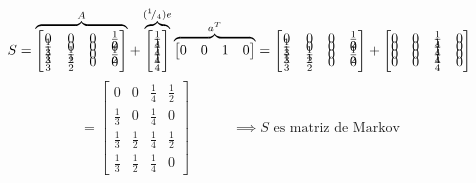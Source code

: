 \begin{align*}
    S =
        \overbrace{
            \begin{bmatrix}
                    0& 0& 0& \frac{1}{2}\\[-0.65em]
                    \frac{1}{3}& 0& 0& 0\\[-0.65em]
                    \frac{1}{3}& \frac{1}{2}& 0& \frac{1}{2}\\[-0.65em]
                    \frac{1}{3}& \frac{1}{2}& 0& 0
            \end{bmatrix}
        }^A
    +
        \overbrace{
            \begin{bmatrix}
                \frac{1}{4}\\[-0.65em]
                \frac{1}{4}\\[-0.65em]
                \frac{1}{4}\\[-0.65em]
                \frac{1}{4}
            \end{bmatrix}
        }^{({}^{1}\!/_{4})e}
        \overbrace{
            \begin{bmatrix}
                0 & 0 & 1 & 0
            \end{bmatrix}
        }^{a^T}
    =
        \begin{bmatrix}
                0& 0& 0& \frac{1}{2}\\[-0.65em]
                \frac{1}{3}& 0& 0& 0\\[-0.65em]
                \frac{1}{3}& \frac{1}{2}& 0& \frac{1}{2}\\[-0.65em]
                \frac{1}{3}& \frac{1}{2}& 0& 0
        \end{bmatrix}
        +
        \begin{bmatrix}
            0&0&\frac{1}{4}&0\\[-0.65em]
            0&0&\frac{1}{4}&0\\[-0.65em]
            0&0&\frac{1}{4}&0\\[-0.65em]
            0&0&\frac{1}{4}&0
        \end{bmatrix}
\end{align*}
\medskip\medskip\medskip
\begin{equation}
    =
        \begin{bmatrix}
            0& 0& \frac{1}{4}& \frac{1}{2}\\[-0.65em]
            \frac{1}{3}& 0& \frac{1}{4}& 0\\[-0.65em]
            \frac{1}{3}& \frac{1}{2}& \frac{1}{4}& \frac{1}{2}\\[-0.65em]
            \frac{1}{3}& \frac{1}{2}& \frac{1}{4}& 0
        \end{bmatrix}
    \quad\quad\quad\implies\text{$S$ es matriz de Markov}
\end{equation}
\medskip

